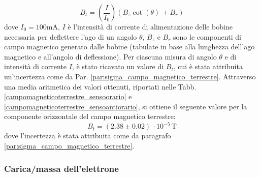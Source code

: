 \documentclass[]{article}
\begin{document}
    \begin{equation}
        \label{mag_terr}
        B_t= \left(\frac{I}{I_0}\right) (B_z \cot(\theta) \, + B_r)
    \end{equation}
    dove $ I_0 = 100 \text{mA} $, $ I $ è l'intensità di corrente di alimentazione delle bobine necessaria per deflettere l'ago di un angolo $\theta $, $B_z$ e $B_r$ sono le componenti di campo magnetico generato dalle bobine (tabulate in base alla lunghezza dell'ago magnetico e all'angolo di deflessione). Per ciascuna misura di angolo $\theta$ e di intensità di corrente $I$, è stato ricavato un valore di $B_t$, cui è stata attribuita un'incertezza come da Par. \ref{par:sigma_campo_magnetico_terrestre}. 
    Attraverso una media aritmetica dei valori ottenuti, riportati nelle Tabb. \ref{campomagneticoterrestre_sensoorario} e \ref{campomagneticoterrestre_sensoantiorario}, si ottiene il seguente valore per la componente orizzontale del campo magnetico terrestre:
    \begin{equation}
        \label{misura_campomagneticoterrestre}
        B_t = ( 2.38\pm 0.02) \, \cdot 10^{-5} \, \text{T}
    \end{equation}
    dove l'incertezza è stata attribuita come da paragrafo \ref{par:sigma_campo_magnetico_terrestre}. \\
    \label{par:campo_magnetico_terrestre}

    \subsubsection{Carica/massa dell'elettrone}
\end{document}
